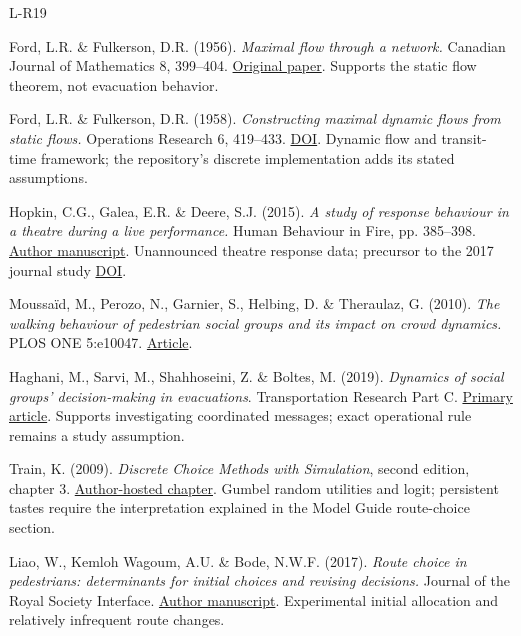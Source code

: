 \documentclass[11pt,a4paper]{article}
\begin{document}
\clearpage
\begin{thebibliography}{L-R19}
 Ford, L.R. \& Fulkerson, D.R. (1956). \emph{Maximal flow through a network.} Canadian Journal of Mathematics 8, 399–404. \href{https://www.cs.yale.edu/homes/lans/readings/routing/ford-max_flow-1956.pdf}{Original paper}. Supports the static flow theorem, not evacuation behavior.

 Ford, L.R. \& Fulkerson, D.R. (1958). \emph{Constructing maximal dynamic flows from static flows.} Operations Research 6, 419–433. \href{https://doi.org/10.1287/opre.6.3.419}{DOI}. Dynamic flow and transit-time framework; the repository's discrete implementation adds its stated assumptions.

 Hopkin, C.G., Galea, E.R. \& Deere, S.J. (2015). \emph{A study of response behaviour in a theatre during a live performance.} Human Behaviour in Fire, pp. 385–398. \href{https://gala.gre.ac.uk/id/eprint/14359/1/14359_GALEA_Response_Behaviour_in_a_Theatre_2015.pdf}{Author manuscript}. Unannounced theatre response data; precursor to the 2017 journal study \href{https://doi.org/10.1002/fam.2424}{DOI}.

 Moussaïd, M., Perozo, N., Garnier, S., Helbing, D. \& Theraulaz, G. (2010). \emph{The walking behaviour of pedestrian social groups and its impact on crowd dynamics.} PLOS ONE 5:e10047. \href{https://doi.org/10.1371/journal.pone.0010047}{Article}.

 Haghani, M., Sarvi, M., Shahhoseini, Z. \& Boltes, M. (2019). \emph{Dynamics of social groups' decision-making in evacuations}. Transportation Research Part C. \href{https://www.sciencedirect.com/science/article/pii/S0968090X18307009}{Primary article}. Supports investigating coordinated messages; exact operational rule remains a study assumption.

 Train, K. (2009). \emph{Discrete Choice Methods with Simulation}, second edition, chapter 3. \href{https://eml.berkeley.edu/books/choice2nd/Ch03_p34-75.pdf}{Author-hosted chapter}. Gumbel random utilities and logit; persistent tastes require the interpretation explained in the Model Guide route-choice section.

 Liao, W., Kemloh Wagoum, A.U. \& Bode, N.W.F. (2017). \emph{Route choice in pedestrians: determinants for initial choices and revising decisions.} Journal of the Royal Society Interface. \href{https://research-information.bris.ac.uk/files/104660277/Nikolai_Bode_Route_choice_in_pedestrians_determinants_for_initial_choices_and_revising.pdf}{Author manuscript}. Experimental initial allocation and relatively infrequent route changes.


\end{thebibliography}
\end{document}
